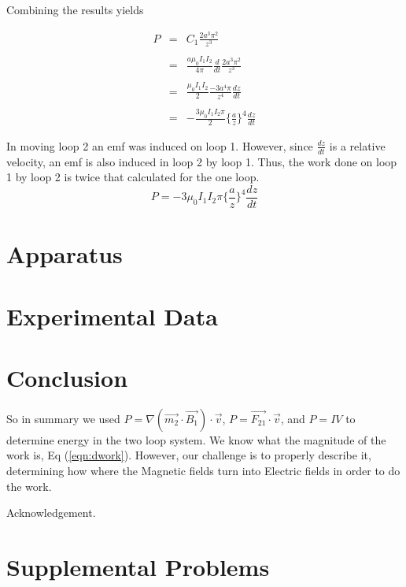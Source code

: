 \documentclass[12pt]{revtex4}
\begin{document}
Combining the results yields

\begin{eqnarray*}
P&=&C_1\frac{ 2a^3 \pi^2}{z^3}  \\ \\
&=&\frac{a\mu_{0}I_{1}I_{2}}{4\pi} \frac{d}{dt} \frac{ 2a^3 \pi^2}{z^3} \\ \\
&=&\frac{\mu_{0}I_{1}I_{2}}{2}  \frac{ -3a^4 \pi}{z^4} \frac{dz}{dt}\\ \\
&=&- \frac{3\mu_{0} I_{1}I_{2}\pi}{2} \Big\{\frac{a}{z}\Big\}^{4}\frac{dz}{dt}
\end{eqnarray*}


In moving loop 2 an emf was induced on loop 1.  However, since $\frac{dz}{dt}$ is a relative velocity, an emf is also induced in loop 2 by loop 1. Thus, the work done on loop 1 by loop 2 is twice that calculated for the one loop. 
\begin{equation}
P=  - 3\mu_{0} I_{1}I_{2}\pi\Big\{\frac{a}{z}\Big\}^{4}\frac{dz}{dt} \label{eqn:totalpower}
\end{equation}

\section{Apparatus}
\section{Experimental Data}


\section{Conclusion}
So in summary we used $P=\nabla (\vec{m_2} \cdot \vec{B_1}) \cdot \vec{v}$, $P= \vec{F_{21}} \cdot \vec{v}$, and $P= IV $ to determine energy in the two loop system.
We know what the magnitude of the work is, Eq (\ref{eqn:dwork}). However, our challenge is to properly describe it, determining how where the Magnetic fields turn into Electric fields in order to do the work.  

\begin{acknowledgements}
Acknowledgement. 
\end{acknowledgements}


\appendix

\section{Supplemental Problems}
\end{document}
